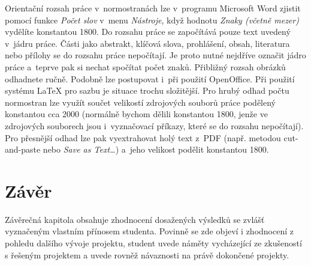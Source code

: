 Orientační rozsah práce v~normostranách lze v~programu Microsoft Word zjistit pomocí funkce {\it Počet slov} v~menu {\it Nástroje}, když hodnotu {\it Znaky (včetně mezer)} vydělíte konstantou 1800. Do rozsahu práce se započítává pouze text uvedený v~jádru práce. Části jako abstrakt, klíčová slova, prohlášení, obsah, literatura nebo přílohy se do rozsahu práce nepočítají. Je proto nutné nejdříve označit jádro práce a~teprve pak si nechat spočítat počet znaků. Přibližný rozsah obrázků odhadnete ručně. Podobně lze postupovat i~při použití OpenOffice. Při použití systému LaTeX pro sazbu je situace trochu složitější. Pro hrubý odhad počtu normostran lze využít součet velikostí zdrojových souborů práce podělený konstantou cca 2000 (normálně bychom dělili konstantou 1800, jenže ve zdrojových souborech jsou i~vyznačovací příkazy, které se do rozsahu nepočítají). Pro přesnější odhad lze pak vyextrahovat holý text z~PDF (např. metodou cut-and-paste nebo {\it Save as Text\ldots}) a~jeho velikost podělit konstantou 1800. 


\chapter{Závěr}
Závěrečná kapitola obsahuje zhodnocení dosažených výsledků se zvlášť vyznačeným vlastním přínosem studenta. Povinně se zde objeví i zhodnocení z pohledu dalšího vývoje projektu, student uvede náměty vycházející ze zkušeností s řešeným projektem a uvede rovněž návaznosti na právě dokončené projekty.

